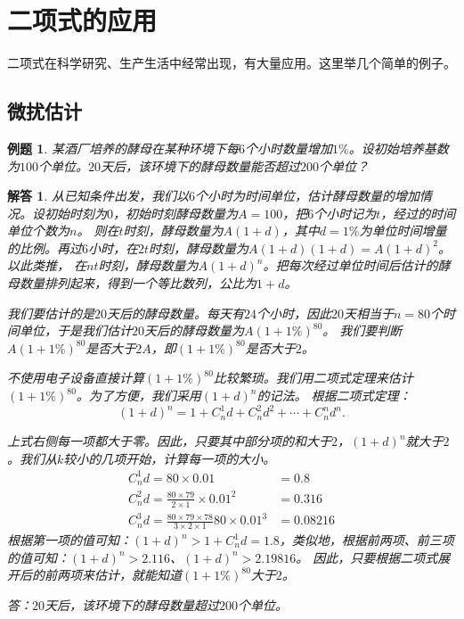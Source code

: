 \documentclass[12pt,UTF8]{ctexbook}
\newtheorem{et}{例题}[section]
\newtheorem*{so}{解答}
\begin{document}
\section{二项式的应用}

二项式在科学研究、生产生活中经常出现，有大量应用。这里举几个简单的例子。

\subsection{微扰估计}
\begin{et}
某酒厂培养的酵母在某种环境下每$6$个小时数量增加$1\%$。设初始培养基数为$100$个单位。$20$天后，该环境下的酵母数量能否超过$200$个单位？
\end{et}
\begin{so}  
    从已知条件出发，我们以$6$个小时为时间单位，估计酵母数量的增加情况。设初始时刻为$0$，初始时刻酵母数量为$A = 100$，把$6$个小时记为$t$，经过的时间单位个数为$n$。
    则在$t$时刻，酵母数量为$A(1 + d)$，其中$d=1\%$为单位时间增量的比例。再过$6$小时，在$2t$时刻，酵母数量为$A(1 + d)(1 + d) = A(1 + d)^2$。以此类推，
    在$nt$时刻，酵母数量为$A(1 + d)^n$。把每次经过单位时间后估计的酵母数量排列起来，得到一个等比数列，公比为$1 + d$。

    我们要估计的是$20$天后的酵母数量。每天有$24$个小时，因此$20$天相当于$n=80$个时间单位，于是我们估计$20$天后的酵母数量为$A(1 + 1\%)^{80}$。
    我们要判断$A(1 + 1\%)^{80}$是否大于$2A$，即$(1 + 1\%)^{80}$是否大于$2$。

    不使用电子设备直接计算$(1 + 1\%)^{80}$比较繁琐。我们用二项式定理来估计$(1 + 1\%)^{80}$。为了方便，我们采用$(1 + d)^n$的记法。
    根据二项式定理：
    $$(1 + d)^n = 1 + C_n^1 d + C_n^2 d^2 + \cdots + C_n^n d^n.$$
    
    上式右侧每一项都大于零。因此，只要其中部分项的和大于$2$，$(1 + d)^n$就大于$2$。我们从$k$较小的几项开始，计算每一项的大小。
    \begin{align*}
        C_n^1 d = 80 \times 0.01 &= 0.8  \\
        C_n^2 d = \frac{80 \times 79}{2\times 1} \times 0.01^2 &= 0.316  \\ 
        C_n^3 d = \frac{80 \times 79\times 78}{3\times 2\times 1}80 \times 0.01^3 &= 0.08216 
    \end{align*}
    根据第一项的值可知：$(1 + d)^n > 1 + C_n^1 d = 1.8$，类似地，根据前两项、前三项的值可知：$(1 + d)^n > 2.116$、$(1 + d)^n > 2.19816$。
    因此，只要根据二项式展开后的前两项来估计，就能知道$(1 + 1\%)^{80}$大于$2$。
    
    答：$20$天后，该环境下的酵母数量超过$200$个单位。
\end{so}
\end{document}
